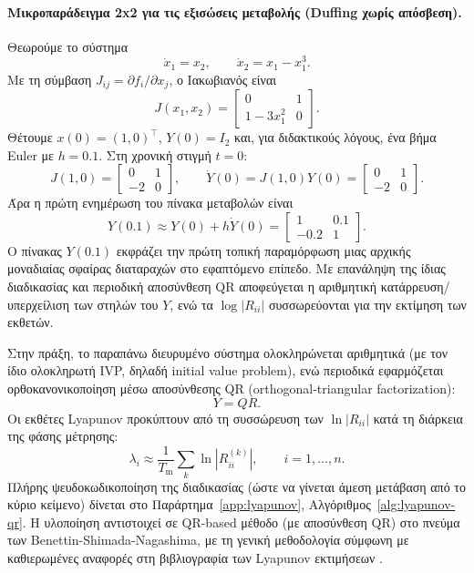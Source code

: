 \documentclass[11pt,a4paper]{report}
\begin{document}
\paragraph{Μικροπαράδειγμα 2x2 για τις εξισώσεις μεταβολής (Duffing χωρίς απόσβεση).}
Θεωρούμε το σύστημα
\begin{equation}
\dot{x}_1=x_2,\qquad
\dot{x}_2=x_1-x_1^3.
\end{equation}
Με τη σύμβαση $J_{ij}=\partial f_i/\partial x_j$, ο Ιακωβιανός είναι
\begin{equation}
J(x_1,x_2)=
\begin{bmatrix}
0 & 1\\
1-3x_1^2 & 0
\end{bmatrix}.
\end{equation}
Θέτουμε $x(0)=(1,0)^\top$, $Y(0)=I_2$ και, για διδακτικούς λόγους, ένα βήμα Euler με $h=0.1$.
Στη χρονική στιγμή $t=0$:
\begin{equation}
J(1,0)=
\begin{bmatrix}
0 & 1\\
-2 & 0
\end{bmatrix},
\qquad
\dot{Y}(0)=J(1,0)Y(0)=
\begin{bmatrix}
0 & 1\\
-2 & 0
\end{bmatrix}.
\end{equation}
Άρα η πρώτη ενημέρωση του πίνακα μεταβολών είναι
\begin{equation}
Y(0.1)\approx Y(0)+h\dot{Y}(0)=
\begin{bmatrix}
1 & 0.1\\
-0.2 & 1
\end{bmatrix}.
\end{equation}
Ο πίνακας $Y(0.1)$ εκφράζει την πρώτη τοπική παραμόρφωση μιας αρχικής μοναδιαίας σφαίρας διαταραχών στο εφαπτόμενο επίπεδο. Με επανάληψη της ίδιας διαδικασίας και περιοδική αποσύνθεση QR αποφεύγεται η αριθμητική κατάρρευση/υπερχείλιση των στηλών του $Y$, ενώ τα $\log|R_{ii}|$ συσσωρεύονται για την εκτίμηση των εκθετών.

Στην πράξη, το παραπάνω διευρυμένο σύστημα ολοκληρώνεται αριθμητικά (με τον ίδιο ολοκληρωτή IVP, δηλαδή initial value problem), ενώ περιοδικά εφαρμόζεται ορθοκανονικοποίηση μέσω αποσύνθεσης QR (orthogonal-triangular factorization):
\begin{equation}
Y = QR.
\end{equation}
Οι εκθέτες Lyapunov προκύπτουν από τη συσσώρευση των $\ln|R_{ii}|$ κατά τη διάρκεια της φάσης μέτρησης:
\begin{equation}
\lambda_i \approx \frac{1}{T_{\mathrm{m}}}\sum_{k}\ln|R_{ii}^{(k)}|, \qquad i=1,\dots,n.
\end{equation}
Πλήρης ψευδοκωδικοποίηση της διαδικασίας (ώστε να γίνεται άμεση μετάβαση
από το κύριο κείμενο) δίνεται στο Παράρτημα~\ref{app:lyapunov},
Αλγόριθμος~\ref{alg:lyapunov-qr}.
Η υλοποίηση αντιστοιχεί σε QR-based μέθοδο (με αποσύνθεση QR) στο πνεύμα των Benettin-Shimada-Nagashima,
με τη γενική μεθοδολογία σύμφωνη με καθιερωμένες αναφορές στη βιβλιογραφία
των Lyapunov εκτιμήσεων \cite{benettin_1980,shimada_nagashima_1979,wolf_1985,dieci_vleck_2002}.
\end{document}
